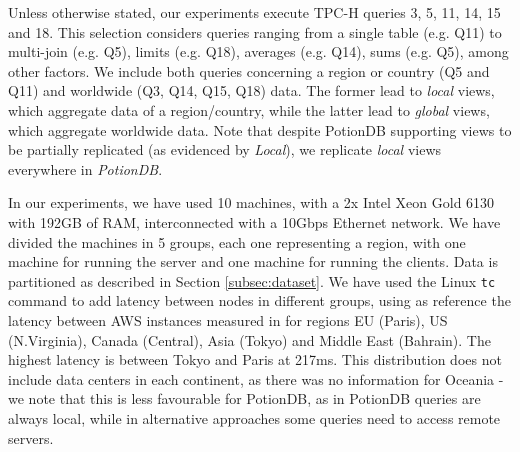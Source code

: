 \documentclass[sigplan,twocolumn,review,anonymous]{acmart}
\begin{document}
Unless otherwise stated, our  experiments execute TPC-H queries 3, 5, 11, 14, 15 and 18.
This selection considers queries ranging from a single table (e.g. Q11) to multi-join (e.g. Q5), limits (e.g. Q18), averages (e.g. Q14), sums (e.g. Q5), among other factors.
We include both queries concerning a region or country (Q5 and Q11) and worldwide (Q3, Q14, Q15, Q18) data.
The former lead to \textit{local} views, which aggregate data of a region/country, while the latter lead to \textit{global} views, which aggregate worldwide data. 
Note that despite PotionDB supporting views to be partially replicated (as evidenced by \textit{Local}), we replicate \textit{local} views everywhere in \textit{PotionDB}. %



In our experiments, we have used 10 machines, with a 2x Intel Xeon Gold 6130 with 192GB of RAM, interconnected with a 10Gbps Ethernet network. 
We have divided the machines in 5 groups,  each one representing a region, with one machine for running the server and one machine for running the clients.  
Data is partitioned as described in Section \ref{subsec:dataset}. 
We have used the Linux \texttt{tc} command to add latency between nodes in different groups, using as reference the latency between AWS instances measured in \cite{AWSLatency} for regions EU (Paris), US (N.Virginia), Canada (Central), Asia (Tokyo) and Middle East (Bahrain). The highest latency is between Tokyo and Paris at 217ms.  This distribution does not include data centers in each continent, as there was no information for Oceania - we note that this is less favourable for PotionDB, as in PotionDB queries are always local, while in alternative approaches some queries need to access remote servers. 
\end{document}
